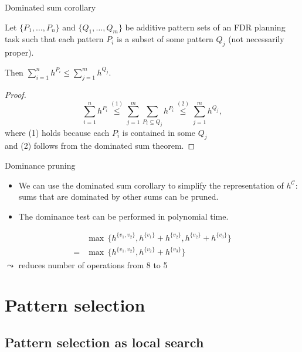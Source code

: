 \documentclass{gkibeamer}
\begin{document}
\begin{frame}{Dominated sum corollary}
  \begin{corollary}
    Let $\{P_1, \dots, P_n\}$ and $\{Q_1, \dots, Q_m\}$ be additive
    pattern sets of an FDR planning task such that each pattern $P_i$
    is a subset of some pattern $Q_j$ (not necessarily proper).

    \smallskip

    Then $\sum_{i=1}^n h^{P_i} \le \sum_{j=1}^m h^{Q_j}$.
  \end{corollary}
  \pause
  \begin{proof}
    \[ \sum_{i=1}^n h^{P_i}
      \stackrel{(1)}{\le} \sum_{j=1}^m \sum_{P_i \subseteq Q_j} h^{P_i}
      \stackrel{(2)}{\le} \sum_{j=1}^m h^{Q_j},
      \]
    where (1) holds because each $P_i$ is contained in some $Q_j$ \\
    and (2) follows from the dominated sum theorem.
  \end{proof}
\end{frame}

\begin{frame}{Dominance pruning}
  \begin{itemize}
  \item We can use the dominated sum corollary to simplify
    the representation of $h^{\mathcal C}$:
    sums that are dominated by other sums can be pruned.
  \item The dominance test can be performed in polynomial time.
  \end{itemize}

  \begin{example}
    \begin{align*}
      &
      \max\,\{
      h^{\{v_1, v_2\}},
      h^{\{v_1\}} + h^{\{v_2\}},
      h^{\{v_2\}} + h^{\{v_3\}}
      \} \\
      {} = {} &
      \max\,\{
      h^{\{v_1, v_2\}},
      h^{\{v_2\}} + h^{\{v_3\}}
      \}
    \end{align*}
    $\leadsto$ reduces number of operations from \alert{8} to
    \alert{5}
  \end{example}
\end{frame}

\section{Pattern selection}
\subsection[Local search]{Pattern selection as local search}
\end{document}
